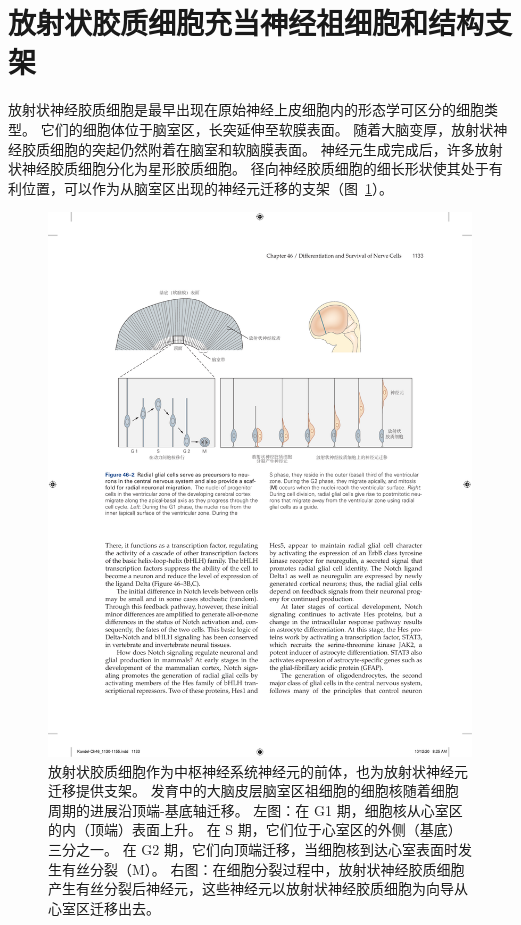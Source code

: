 \section{放射状胶质细胞充当神经祖细胞和结构支架}

放射状神经胶质细胞是最早出现在原始神经上皮细胞内的形态学可区分的细胞类型。
它们的细胞体位于脑室区，长突延伸至软膜表面。
随着大脑变厚，放射状神经胶质细胞的突起仍然附着在脑室和软脑膜表面。
神经元生成完成后，许多放射状神经胶质细胞分化为星形胶质细胞。
径向神经胶质细胞的细长形状使其处于有利位置，可以作为从脑室区出现的神经元迁移的支架（图~\ref{fig:46_2}）。


\begin{figure}[htbp]
	\centering
	\includegraphics[width=1.0\linewidth]{chap46/fig_46_2}
	\caption{放射状胶质细胞作为中枢神经系统神经元的前体，也为放射状神经元迁移提供支架。
		发育中的大脑皮层脑室区祖细胞的细胞核随着细胞周期的进展沿顶端-基底轴迁移。
		左图：在 G1 期，细胞核从心室区的内（顶端）表面上升。
		在 S 期，它们位于心室区的外侧（基底）三分之一。
		在 G2 期，它们向顶端迁移，当细胞核到达心室表面时发生有丝分裂（M）。
		右图：在细胞分裂过程中，放射状神经胶质细胞产生有丝分裂后神经元，这些神经元以放射状神经胶质细胞为向导从心室区迁移出去。}
	\label{fig:46_2}
\end{figure}


